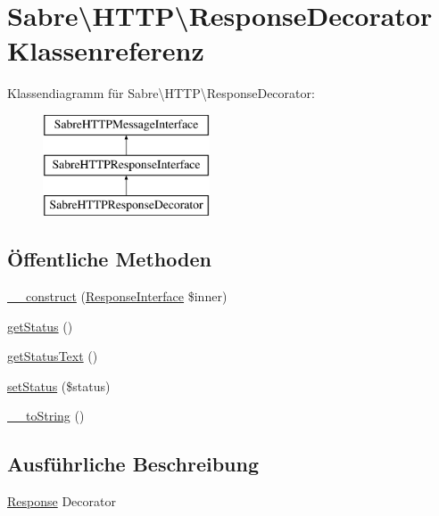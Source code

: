 \hypertarget{class_sabre_1_1_h_t_t_p_1_1_response_decorator}{}\section{Sabre\textbackslash{}H\+T\+TP\textbackslash{}Response\+Decorator Klassenreferenz}
\label{class_sabre_1_1_h_t_t_p_1_1_response_decorator}
Klassendiagramm für Sabre\textbackslash{}H\+T\+TP\textbackslash{}Response\+Decorator\+:\begin{figure}[H]
\begin{center}
\leavevmode
\includegraphics[height=3.000000cm]{class_sabre_1_1_h_t_t_p_1_1_response_decorator}
\end{center}
\end{figure}
\subsection*{Öffentliche Methoden}
\begin{DoxyCompactItemize}
\item 
\mbox{\hyperlink{class_sabre_1_1_h_t_t_p_1_1_response_decorator_a892f76d8a12c9133093843e4f49dacef}{\+\_\+\+\_\+construct}} (\mbox{\hyperlink{interface_sabre_1_1_h_t_t_p_1_1_response_interface}{Response\+Interface}} \$inner)
\item 
\mbox{\hyperlink{class_sabre_1_1_h_t_t_p_1_1_response_decorator_ac5b7d13566a0597fd437ac8d72a5becc}{get\+Status}} ()
\item 
\mbox{\hyperlink{class_sabre_1_1_h_t_t_p_1_1_response_decorator_a74d8862eeb17eeba7777ba54e0456918}{get\+Status\+Text}} ()
\item 
\mbox{\hyperlink{class_sabre_1_1_h_t_t_p_1_1_response_decorator_a0b3f39d2f9af949ab2a1cd63516f2934}{set\+Status}} (\$status)
\item 
\mbox{\hyperlink{class_sabre_1_1_h_t_t_p_1_1_response_decorator_aa744751810b8ff7cb390fb642f02fbb0}{\+\_\+\+\_\+to\+String}} ()
\end{DoxyCompactItemize}


\subsection{Ausführliche Beschreibung}
\mbox{\hyperlink{class_sabre_1_1_h_t_t_p_1_1_response}{Response}} Decorator

